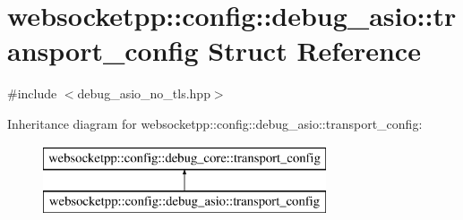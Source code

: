 \hypertarget{structwebsocketpp_1_1config_1_1debug__asio_1_1transport__config}{}\section{websocketpp\+:\+:config\+:\+:debug\+\_\+asio\+:\+:transport\+\_\+config Struct Reference}
\label{structwebsocketpp_1_1config_1_1debug__asio_1_1transport__config}


{\ttfamily \#include $<$debug\+\_\+asio\+\_\+no\+\_\+tls.\+hpp$>$}

Inheritance diagram for websocketpp\+:\+:config\+:\+:debug\+\_\+asio\+:\+:transport\+\_\+config\+:\begin{figure}[H]
\begin{center}
\leavevmode
\includegraphics[height=2.000000cm]{structwebsocketpp_1_1config_1_1debug__asio_1_1transport__config}
\end{center}
\end{figure}
